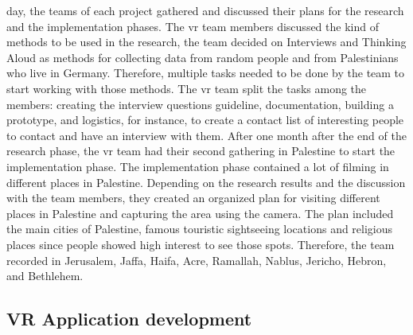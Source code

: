 day, the teams of each project gathered and discussed their plans for the research and the
implementation phases. The \acrshort{vr} team members discussed the kind of methods to be used in
the research, the team decided on Interviews and Thinking Aloud as methods for collecting
data from random people and from Palestinians who live in Germany. Therefore, multiple tasks needed to be done by the team to start working with those methods. The \acrshort{vr}
team split the tasks among the members: creating the interview questions guideline,
documentation, building a prototype, and logistics, for instance, to create a contact list of
interesting people to contact and have an interview with them.
After one month after the end of the research phase, the \acrshort{vr} team had their second gathering
in Palestine to start the implementation phase. The implementation phase contained a lot of
filming in different places in Palestine. Depending on the research results and the discussion
with the team members, they created an organized plan for visiting different places in
Palestine and capturing the area using the camera. The plan included the main cities of
Palestine, famous touristic sightseeing locations and religious places since people showed
high interest to see those spots. Therefore, the team recorded in Jerusalem, Jaffa, Haifa, Acre, Ramallah, Nablus, Jericho, Hebron, and Bethlehem.

\subsection{VR Application development}

